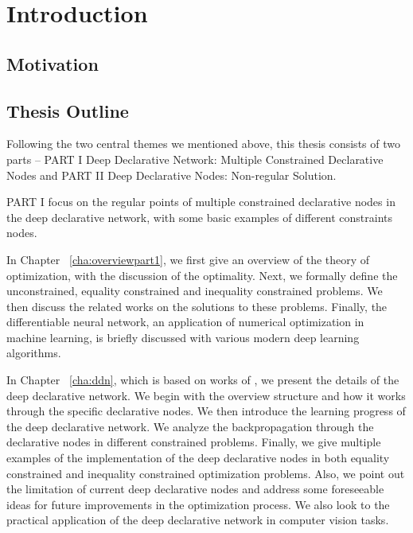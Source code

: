 \chapter{Introduction}
\label{cha:intro}

\section{Motivation}
\label{sec:motivation}




\section{Thesis Outline}
\label{sec:outline}
Following the two central themes we mentioned above, this thesis consists of two parts -- PART I Deep Declarative Network: Multiple Constrained Declarative Nodes and PART II Deep Declarative Nodes: Non-regular Solution. 
\par PART I focus on the regular points of multiple constrained declarative nodes in the deep declarative network, with some basic examples of different constraints nodes. 
\begin{description}
    \item In Chapter ~\ref{cha:overviewpart1}, we first give an overview of the theory of optimization, with the discussion of the optimality. Next, we formally define the unconstrained, equality constrained and inequality constrained problems. We then discuss the related works on the solutions to these problems. Finally, the differentiable neural network, an application of numerical optimization in machine learning, is briefly discussed with various modern deep learning algorithms.  
    \item In Chapter ~\ref{cha:ddn}, which is based on works of \cite{SG:19}, we present the details of the deep declarative network. We begin with the overview structure and how it works through the specific declarative nodes. We then introduce the learning progress of the deep declarative network. We analyze the backpropagation through the declarative nodes in different constrained problems. Finally, we give multiple examples of the implementation of the deep declarative nodes in both equality constrained and inequality constrained optimization problems. Also, we point out the limitation of current deep declarative nodes and address some foreseeable ideas for future improvements in the optimization process. We also look to the practical application of the deep declarative network in computer vision tasks.
\end{description}

